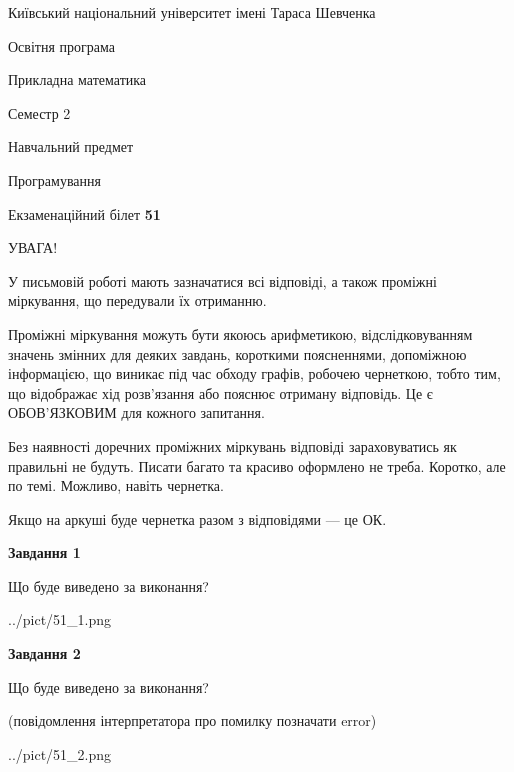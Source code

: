 \documentclass[12pt, ukrainian]{article}
\begin{document}
{{\begin {small}\par
{ \center  Київський національний університет імені Тараса Шевченка \par}
{\parbox {5 cm}{Освітня програма \hfill}{\parbox {7 cm}{Прикладна математика\hfill}}\parbox {6 cm}{\hfill Семестр 2}}\par
{\parbox {5 cm} {Навчальний предмет \hfill}\parbox {7 cm}{Програмування \hfill}\parbox {6cm}{\hfill}\par}\vspace{-7pt} \end{small}}{\center Екзаменаційний білет \No \textbf
{ 51 }\par}}
{
\begin {large}
УВАГА!

У письмовій роботі мають зазначатися всі відповіді, а також проміжні міркування, що передували їх отриманню.

Проміжні міркування можуть бути якоюсь арифметикою, відслідковуванням зна\-чень змінних для деяких завдань,
короткими поясненнями, допоміжною інформацією, що виникає під час обходу графів, робочею чернеткою,
тобто тим, що відображає хід розв’язання або пояснює отриману відповідь.
Це є ОБОВ’ЯЗКОВИМ для кожного запитання.

Без наявності доречних проміжних міркувань відповіді зараховуватись як правиль\-ні не будуть.
Писати багато та красиво оформлено не треба. Коротко, але по темі. Можли\-во, навіть чернетка.

Якщо на аркуші буде чернетка разом з відповідями --- це ОК.

\newpage

{\begin {center}\textbf{Завдання 1}\end {center}}\par
Що буде виведено за виконання?\par
\begin{center}
	{../pict/51_1.png}
\end{center}
\newpage

{\begin {center}\textbf{Завдання 2}\end {center}}\par
Що буде виведено за виконання?\par
 (повідомлення інтерпретатора про помилку позначати error)\par
\begin{center}
	{../pict/51_2.png}
\end{center}
\newpage


\end{large}}
\end{document}
